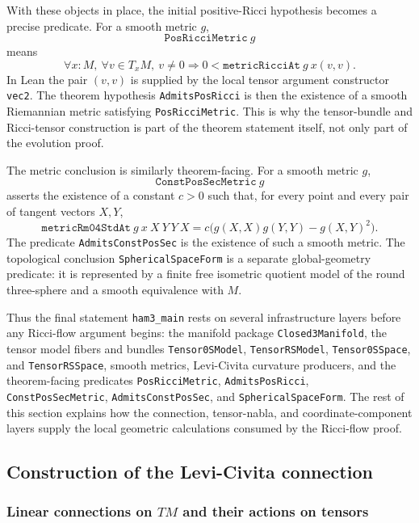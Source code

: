 \documentclass[11pt]{article}
\theoremstyle{plain}
\theoremstyle{definition}
\theoremstyle{remark}
\newcommand{\leanref}[1]{\nolinkurl{#1}}
\begin{document}
With these objects in place, the initial positive-Ricci hypothesis becomes a
precise predicate.  For a smooth metric \(g\),
\[
  \mathtt{PosRicciMetric}\ g
\]
means
\[
  \forall x:M,\ \forall v\in T_xM,\ v\ne0
  \Longrightarrow
  0 <
  \mathtt{metricRicciAt}\ g\ x(v,v).
\]
In Lean the pair \((v,v)\) is supplied by the local tensor argument constructor
\leanref{vec2}.  The theorem hypothesis
\leanref{AdmitsPosRicci} is then the existence of a smooth Riemannian metric satisfying
\leanref{PosRicciMetric}.  This is why the tensor-bundle and Ricci-tensor
construction is part of the theorem statement itself, not only part of the
evolution proof.

The metric conclusion is similarly theorem-facing.  For a smooth metric \(g\),
\[
  \mathtt{ConstPosSecMetric}\ g
\]
asserts the existence of a constant \(c>0\) such that, for every point and every
pair of tangent vectors \(X,Y\),
\[
  \mathtt{metricRm04StdAt}\ g\ x\ X\ Y\ Y\ X
  =
  c\bigl(
      g(X,X)g(Y,Y)-g(X,Y)^2
    \bigr).
\]
The predicate \leanref{AdmitsConstPosSec} is the existence of such a smooth
metric.  The topological conclusion \leanref{SphericalSpaceForm} is a separate
global-geometry predicate: it is represented by a finite free isometric
quotient model of the round three-sphere and a smooth equivalence with \(M\).

Thus the final statement \leanref{ham3_main} rests on several infrastructure
layers before any Ricci-flow argument begins:
the manifold package \leanref{Closed3Manifold}, the tensor model fibers and
bundles \leanref{Tensor0SModel}, \leanref{TensorRSModel},
\leanref{Tensor0SSpace}, and \leanref{TensorRSSpace}, smooth metrics,
Levi-Civita curvature producers, and the theorem-facing predicates
\leanref{PosRicciMetric}, \leanref{AdmitsPosRicci},
\leanref{ConstPosSecMetric}, \leanref{AdmitsConstPosSec}, and
\leanref{SphericalSpaceForm}.  The rest of this section explains how the
connection, tensor-nabla, and coordinate-component layers supply the local
geometric calculations consumed by the Ricci-flow proof.

\subsection{Construction of the Levi-Civita connection}

\subsubsection{Linear connections on \texorpdfstring{$TM$}{TM} and their actions on tensors}
\end{document}

